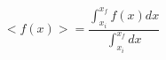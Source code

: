 \documentclass[preview]{standalone}
\begin{document}
\begin{align*}
<f(x)>=\dfrac{\int_{x_i}^{x_f} f(x) d\!x}{\int_{x_i}^{x_f} d\!x}
\end{align*}
\end{document}
